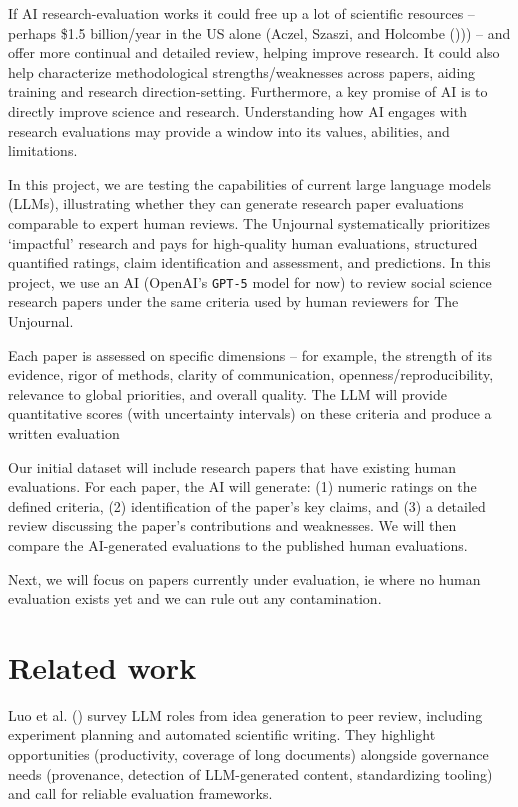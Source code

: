 \documentclass[
  11pt,
  letterpaper,
  DIV=11,
  numbers=noendperiod]{scrreprt}
\begin{document}
If AI research-evaluation works it could free up a lot of scientific
resources -- perhaps \$1.5 billion/year in the US alone (Aczel, Szaszi,
and Holcombe ())) -- and offer more
continual and detailed review, helping improve research. It could also
help characterize methodological strengths/weaknesses across papers,
aiding training and research direction-setting. Furthermore, a key
promise of AI is to directly improve science and research. Understanding
how AI engages with research evaluations may provide a window into its
values, abilities, and limitations.

In this project, we are testing the capabilities of current large
language models (LLMs), illustrating whether they can generate research
paper evaluations comparable to expert human reviews. The Unjournal
systematically prioritizes `impactful' research and pays for
high-quality human evaluations, structured quantified ratings, claim
identification and assessment, and predictions. In this project, we use
an AI (OpenAI's \texttt{GPT-5} model for now) to review social science
research papers under the same criteria used by human reviewers for The
Unjournal.

Each paper is assessed on specific dimensions -- for example, the
strength of its evidence, rigor of methods, clarity of communication,
openness/reproducibility, relevance to global priorities, and overall
quality. The LLM will provide quantitative scores (with uncertainty
intervals) on these criteria and produce a written evaluation

Our initial dataset will include research papers that have existing
human evaluations. For each paper, the AI will generate: (1) numeric
ratings on the defined criteria, (2) identification of the paper's key
claims, and (3) a detailed review discussing the paper's contributions
and weaknesses. We will then compare the AI-generated evaluations to the
published human evaluations.

Next, we will focus on papers currently under evaluation, ie where no
human evaluation exists yet and we can rule out any contamination.

\section{Related work}\label{related-work}

Luo et al. () survey LLM roles from idea
generation to peer review, including experiment planning and automated
scientific writing. They highlight opportunities (productivity, coverage
of long documents) alongside governance needs (provenance, detection of
LLM-generated content, standardizing tooling) and call for reliable
evaluation frameworks.
\end{document}
